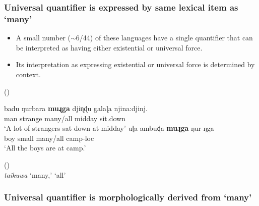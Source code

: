 \documentclass{article}
\begin{document}
\subsubsection{Universal quantifier is expressed by same lexical item as `many'}
\begin{itemize}
\item A small number  ($\sim$6/44) of these languages have a single quantifier that can be interpreted as having either existential or universal force.
\item Its interpretation as expressing existential or universal force is determined by context.
\end{itemize}
\begin{exe}
   (\citealt[56,65]{platt72}) 
  \begin{xlist}
    \ex \gll badu ŋurbara \textbf{muɻga} {djiɳɖu galaɭa} njina:djinj. \\ 
    man  strange  many/all  midday         sit.down\\
    \glt `A lot of strangers sat down at midday'
    \ex \gll uɭa ambuɖa \textbf{muɻga} ŋur-ŋga  \\
    boy   small    many/all      camp-{\sc loc}\\
    \glt        `All the boys are at camp.'%
  \end{xlist}
   (\citealt[85,107]{osborne74})\\
  {\it taikuwa} `many,' `all'

\end{exe}


\subsubsection{Universal quantifier is morphologically derived from `many'}
\end{document}
